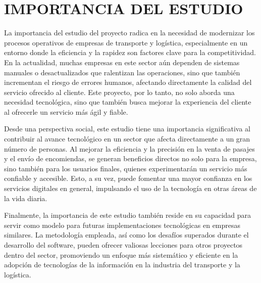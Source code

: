 \section{IMPORTANCIA DEL ESTUDIO}

	La importancia del estudio del proyecto radica en la necesidad de modernizar los procesos operativos de empresas de transporte y logística, especialmente en un entorno donde la eficiencia y la rapidez son factores clave para la competitividad. En la actualidad, muchas empresas en este sector aún dependen de sistemas manuales o desactualizados que ralentizan las operaciones, sino que también incrementan el riesgo de errores humanos, afectando directamente la calidad del servicio ofrecido al cliente. Este proyecto, por lo tanto, no solo aborda una necesidad tecnológica, sino que también busca mejorar la experiencia del cliente al ofrecerle un servicio más ágil y fiable.
	
	Desde una perspectiva social, este estudio tiene una importancia significativa al contribuir al avance tecnológico en un sector que afecta directamente a un gran número de personas. Al mejorar la eficiencia y la precisión en la venta de pasajes y el envío de encomiendas, se generan beneficios directos no solo para la empresa, sino también para los usuarios finales, quienes experimentarán un servicio más confiable y accesible. Esto, a su vez, puede fomentar una mayor confianza en los servicios digitales en general, impulsando el uso de la tecnología en otras áreas de la vida diaria.
	
	Finalmente, la importancia de este estudio también reside en su capacidad para servir como modelo para futuras implementaciones tecnológicas en empresas similares. La metodología empleada, así como los desafíos superados durante el desarrollo del software, pueden ofrecer valiosas lecciones para otros proyectos dentro del sector, promoviendo un enfoque más sistemático y eficiente en la adopción de tecnologías de la información en la industria del transporte y la logística.
	